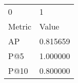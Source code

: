 \begin{tabular}{ll}
0 & 1 \\
Metric & Value \\
AP & 0.815659 \\
P@5 & 1.000000 \\
P@10 & 0.800000 \\
\end{tabular}

